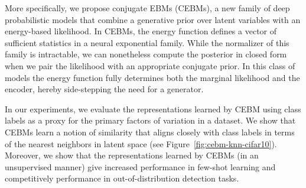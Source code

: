 \documentclass[tablecaption=bottom,wcp]{jmlr} %
\begin{document}
More specifically, we propose conjugate EBMs (CEBMs), a new family of deep probabilistic models that combine a generative prior over latent variables with an energy-based likelihood. In CEBMs, the energy function defines a vector of sufficient statistics in a neural exponential family. While the normalizer of this family is intractable, we can nonetheless compute the posterior in closed form when we pair the likelihood with an appropriate conjugate prior. In this class of models the energy function fully determines both the marginal likelihood and the encoder, hereby side-stepping the need for a generator.




In our experiments, we evaluate the representations learned by CEBM using class labels as a proxy for the primary factors of variation in a dataset. We show that CEBMs learn a notion of similarity that aligns closely with class labels in terms of the nearest neighbors in latent space (see Figure~\ref{fig:cebm-knn-cifar10}). Moreover, we show that the representations learned by CEBMs (in an unsupervised manner) give increased performance in few-shot learning and competitively performance in out-of-distribution detection tasks.
\end{document}
